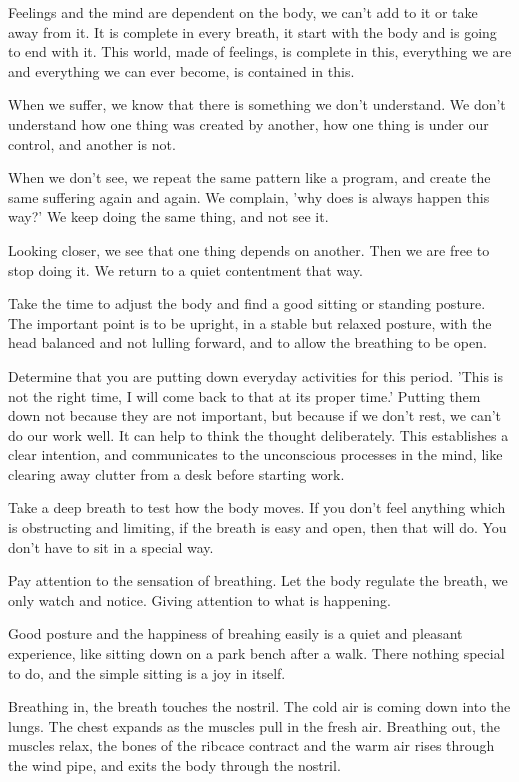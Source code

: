 Feelings and the mind are dependent on the body, we can't add to it or
take away from it. It is complete in every breath, it start with the
body and is going to end with it. This world, made of feelings, is
complete in this, everything we are and everything we can ever become,
is contained in this.

When we suffer, we know that there is something we don't understand. We
don't understand how one thing was created by another, how one thing is
under our control, and another is not.

When we don't see, we repeat the same pattern like a program, and create
the same suffering again and again. We complain, 'why does is always
happen this way?' We keep doing the same thing, and not see it.

Looking closer, we see that one thing depends on another. Then we are
free to stop doing it. We return to a quiet contentment that way.

Take the time to adjust the body and find a good sitting or standing
posture. The important point is to be upright, in a stable but relaxed
posture, with the head balanced and not lulling forward, and to allow
the breathing to be open.

Determine that you are putting down everyday activities for this period.
'This is not the right time, I will come back to that at its proper
time.' Putting them down not because they are not important, but because
if we don't rest, we can't do our work well. It can help to think the
thought deliberately. This establishes a clear intention, and
communicates to the unconscious processes in the mind, like clearing
away clutter from a desk before starting work.

Take a deep breath to test how the body moves. If you don't feel
anything which is obstructing and limiting, if the breath is easy and
open, then that will do. You don't have to sit in a special way.

Pay attention to the sensation of breathing. Let the body regulate the
breath, we only watch and notice. Giving attention to what is happening.

Good posture and the happiness of breahing easily is a quiet and
pleasant experience, like sitting down on a park bench after a walk.
There nothing special to do, and the simple sitting is a joy in itself.

Breathing in, the breath touches the nostril. The cold air is coming
down into the lungs. The chest expands as the muscles pull in the fresh
air. Breathing out, the muscles relax, the bones of the ribcace contract
and the warm air rises through the wind pipe, and exits the body through
the nostril.

